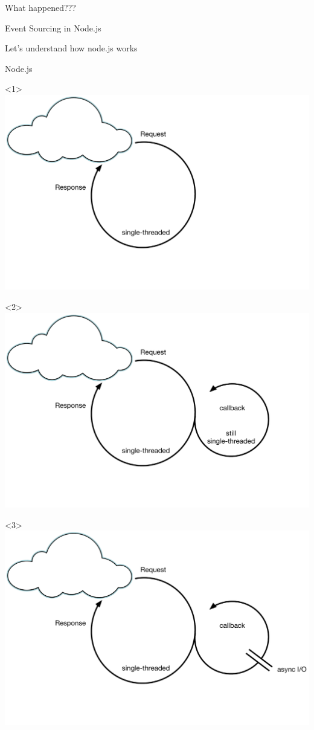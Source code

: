 \begin{frame}[fragile]{}

\begin{center}
\Huge
What happened???
\end{center}

\end{frame}

\begin{frame}[fragile]{Event Sourcing in Node.js}

Let's understand how node.js works

\end{frame}

\begin{frame}[fragile]{Node.js}

\begin{onlyenv}<1>
\includegraphics[width=.7\textwidth]{../Nodejs1.pdf}
\end{onlyenv}

\begin{onlyenv}<2>
\includegraphics[width=.7\textwidth]{../Nodejs2.pdf}
\end{onlyenv}

\begin{onlyenv}<3>
\includegraphics[width=.7\textwidth]{../Nodejs3.pdf}
\end{onlyenv}


\end{frame}
